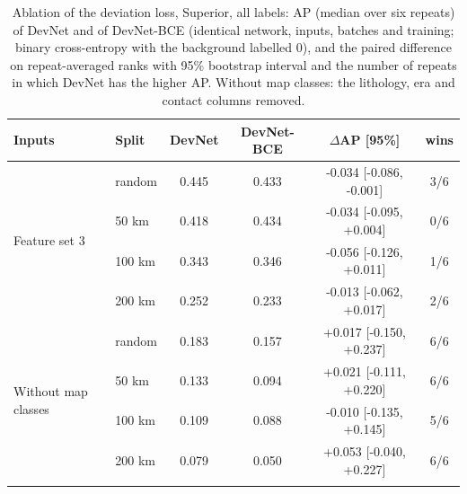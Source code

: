 \documentclass[pdflatex,sn-apa]{sn-jnl}
\begin{document}
\begin{table}[t]
\caption{Ablation of the deviation loss, Superior, all labels: AP (median over six repeats) of DevNet and of DevNet-BCE (identical network, inputs, batches and training; binary cross-entropy with the background labelled 0), and the paired difference on repeat-averaged ranks with 95\% bootstrap interval and the number of repeats in which DevNet has the higher AP. Without map classes: the lithology, era and contact columns removed.}\label{tab:loss-ablation}
\footnotesize
\setlength{\tabcolsep}{3pt}
\begin{tabular*}{\textwidth}{@{\extracolsep\fill}llcccc}
\toprule
Inputs & Split & DevNet & DevNet-BCE & $\Delta$AP [95\%] & wins \\
\midrule
\multirow{4}{*}{Feature set 3} & random & 0.445 & 0.433 & -0.034 [-0.086, -0.001] & 3/6 \\
 & 50 km & 0.418 & 0.434 & -0.034 [-0.095, +0.004] & 0/6 \\
 & 100 km & 0.343 & 0.346 & -0.056 [-0.126, +0.011] & 1/6 \\
 & 200 km & 0.252 & 0.233 & -0.013 [-0.062, +0.017] & 2/6 \\
\midrule
\multirow{4}{*}{Without map classes} & random & 0.183 & 0.157 & +0.017 [-0.150, +0.237] & 6/6 \\
 & 50 km & 0.133 & 0.094 & +0.021 [-0.111, +0.220] & 6/6 \\
 & 100 km & 0.109 & 0.088 & -0.010 [-0.135, +0.145] & 5/6 \\
 & 200 km & 0.079 & 0.050 & +0.053 [-0.040, +0.227] & 6/6 \\
\botrule
\end{tabular*}
\end{table}
\end{document}

